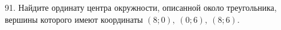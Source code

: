 91. Найдите ординату центра окружности, описанной около треугольника, вершины которого имеют координаты $(8;0),\ (0;6),\ (8;6).$\\
